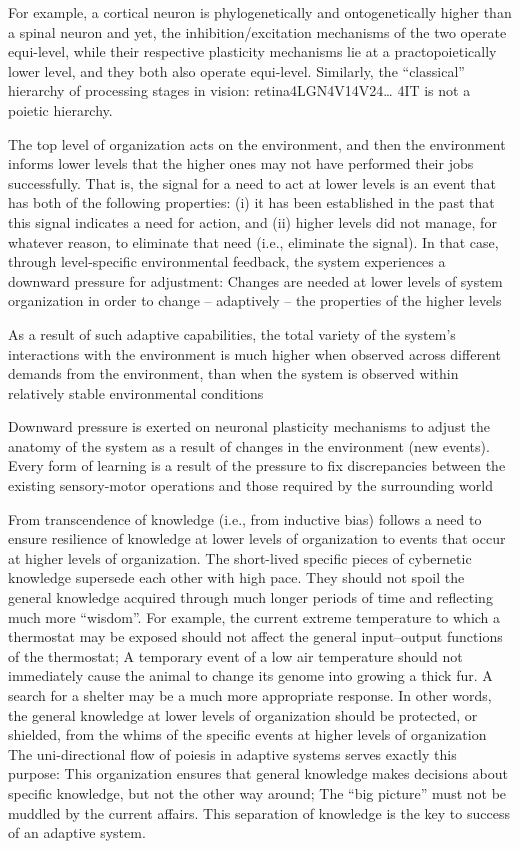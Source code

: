 \documentclass[10pt,a4paper]{article}
\begin{document}
For example, a cortical neuron is phylogenetically and ontogenetically higher
than a spinal neuron and yet, the inhibition/excitation mechanisms of the two
operate equi-level, while their respective plasticity mechanisms lie at a practopoietically
lower level, and they both also operate equi-level. Similarly, the
“classical” hierarchy of processing stages in vision: retina4LGN4V14V24…
4IT is not a poietic hierarchy.

The
top level of organization acts on the environment, and then the
environment informs lower levels that the higher ones may not
have performed their jobs successfully. That is, the signal for a need
to act at lower levels is an event that has both of the following
properties: (i) it has been established in the past that this signal
indicates a need for action, and (ii) higher levels did not manage, for
whatever reason, to eliminate that need (i.e., eliminate the signal). In that case, through level-specific environmental feedback, the
system experiences a downward pressure for adjustment: Changes are
needed at lower levels of system organization in order to change –
adaptively – the properties of the higher levels

As a result of such adaptive capabilities, the total variety of the
system’s interactions with the environment is much higher when
observed across different demands from the environment, than
when the system is observed within relatively stable environmental
conditions

Downward pressure is exerted on neuronal plasticity mechanisms
to adjust the anatomy of the system as a result of changes in the
environment (new events). Every form of learning is a result of the
pressure to fix discrepancies between the existing sensory-motor
operations and those required by the surrounding world

From transcendence of knowledge (i.e., from inductive bias)
follows a need to ensure resilience of knowledge at lower levels of
organization to events that occur at higher levels of organization. The
short-lived specific pieces of cybernetic knowledge supersede each
other with high pace. They should not spoil the general knowledge
acquired through much longer periods of time and reflecting much
more “wisdom”. For example, the current extreme temperature to
which a thermostat may be exposed should not affect the general
input–output functions of the thermostat; A temporary event of a
low air temperature should not immediately cause the animal to
change its genome into growing a thick fur. A search for a shelter
may be a much more appropriate response.
In other words, the general knowledge at lower levels of organization
should be protected, or shielded, from the whims of the specific
events at higher levels of organization The uni-directional flow of
poiesis in adaptive systems serves exactly this purpose: This organization
ensures that general knowledge makes decisions about specific
knowledge, but not the other way around; The “big picture” must not
be muddled by the current affairs. This separation of knowledge is the
key to success of an adaptive system.
\end{document}
